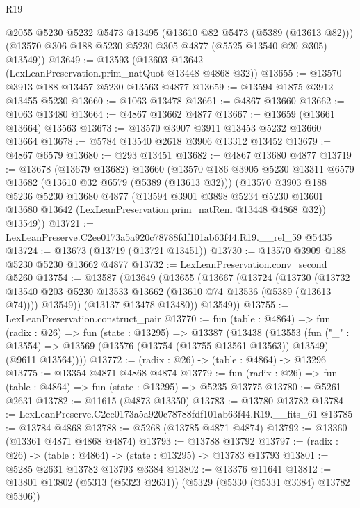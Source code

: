\begin{lexlean}{R19}
\begin{coremodule}
      @2055
      @5230
      @5232
      @5473
      @13495
      (@13610 @82 @5473 (@5389 (@13613 @82)))
      (@13570 @306 @188 @5230 @5230 @305 @4877 (@5525 @13540 @20 @305) @13549))
@13649 := @13593 (@13603 @13642 (LexLeanPreservation.prim_natQuot @13448 @4868 @32))
@13655 := @13570 @3913 @188 @13457 @5230 @13563 @4877
@13659 := @13594 @1875 @3912 @13455 @5230
@13660 := @1063 @13478
@13661 := @4867 @13660
@13662 := @1063 @13480
@13664 := @4867 @13662 @4877
@13667 := @13659 (@13661 @13664) @13563
@13673 := @13570 @3907 @3911 @13453 @5232 @13660 @13664
@13678 := @5784 @13540 @2618 @3906 @13312 @13452
@13679 := @4867 @6579
@13680 := @293 @13451
@13682 := @4867 @13680 @4877
@13719 := @13678
    (@13679 @13682)
    @13660
    (@13570
      @186
      @3905
      @5230
      @13311
      @6579
      @13682
      (@13610 @32 @6579 (@5389 (@13613 @32)))
      (@13570
        @3903
        @188
        @5236
        @5230
        @13680
        @4877
        (@13594
          @3901
          @3898
          @5234
          @5230
          @13601
          @13680
          @13642
          (LexLeanPreservation.prim_natRem @13448 @4868 @32))
        @13549))
@13721 := LexLeanPreserve.C2ee0173a5a920c78788fdf101ab63f44.R19.__rel_59 @5435
@13724 := @13673 (@13719 (@13721 @13451))
@13730 := @13570 @3909 @188 @5230 @5230 @13662 @4877
@13732 := LexLeanPreservation.conv_second @5260
@13754 := @13587
    (@13649
      (@13655
        (@13667
          (@13724
            (@13730
              (@13732 @13540 @203 @5230 @13533 @13662 (@13610 @74 @13536 (@5389 (@13613 @74))))
              @13549))
          (@13137 @13478 @13480))
        @13549))
@13755 := LexLeanPreservation.construct_pair
@13770 := fun (table : @4864) =>
  fun (radix : @26) =>
  fun (state : @13295) =>
  @13387
    (@13438
      (@13553
        (fun ("_" : @13554) =>
        @13569 (@13576 (@13754 (@13755 @13561 @13563)) @13549) (@9611 @13564))))
@13772 := (radix : @26) -> (table : @4864) -> @13296
@13775 := @13354 @4871 @4868 @4874
@13779 := fun (radix : @26) => fun (table : @4864) => fun (state : @13295) => @5235 @13775
@13780 := @5261 @2631
@13782 := @11615 (@4873 @13350)
@13783 := @13780 @13782
@13784 := LexLeanPreserve.C2ee0173a5a920c78788fdf101ab63f44.R19.__fits_61
@13785 := @13784 @4868
@13788 := @5268 (@13785 @4871 @4874)
@13792 := @13360 (@13361 @4871 @4868 @4874)
@13793 := @13788 @13792
@13797 := (radix : @26) -> (table : @4864) -> (state : @13295) -> @13783 @13793
@13801 := @5285 @2631 @13782 @13793 @3384
@13802 := @13376 @11641
@13812 := @13801 @13802 (@5313 (@5323 @2631)) (@5329 (@5330 (@5331 @3384) @13782 @5306))

\end{coremodule}
\end{lexlean}
